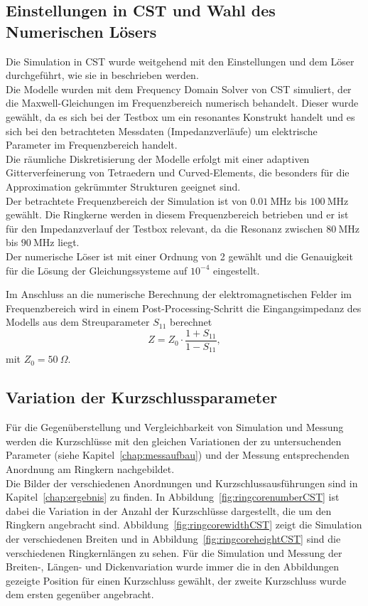         \subsection{Einstellungen in CST und Wahl des Numerischen Lösers}
        Die Simulation in CST wurde weitgehend mit den Einstellungen und dem Löser durchgeführt, wie sie in \citep{bast2017ba} beschrieben werden.\\
        Die Modelle wurden mit dem Frequency Domain Solver von CST simuliert, der die Maxwell-Gleichungen im Frequenzbereich numerisch behandelt. Dieser wurde gewählt, da es sich bei der Testbox um ein resonantes Konstrukt handelt und es sich bei den betrachteten Messdaten (Impedanzverläufe) um elektrische Parameter im Frequenzbereich handelt.\\
        Die räumliche Diskretisierung der Modelle erfolgt mit einer adaptiven Gitterverfeinerung von Tetraedern und Curved-Elements, die besonders für die Approximation gekrümmter Strukturen geeignet sind.\\
        Der betrachtete Frequenzbereich der Simulation ist von $\SI{0,01}{\mega\hertz}$ bis $\SI{100}{\mega\hertz}$ gewählt. Die Ringkerne werden in diesem Frequenzbereich betrieben und er ist für den Impedanzverlauf der Testbox relevant, da die Resonanz zwischen $\SI{80}{\mega\hertz}$ bis $\SI{90}{\mega\hertz}$ liegt.\\
        Der numerische Löser ist mit einer Ordnung von 2 gewählt und die Genauigkeit für die Lösung der Gleichungssysteme auf $10^{-4}$ eingestellt.
        \par 
        Im Anschluss an die numerische Berechnung der elektromagnetischen Felder im Frequenzbereich wird in einem Post-Processing-Schritt die Eingangsimpedanz des Modells aus dem Streuparameter $S_{11}$ berechnet
            \begin{equation}
                Z = Z_0 \cdot\frac{1+S_{11}}{1-S_{11}},
            \end{equation}
        mit $Z_0 = \SI{50}{\Omega}$.
        
        \subsection{Variation der Kurzschlussparameter}
        Für die Gegenüberstellung und Vergleichbarkeit von Simulation und Messung werden die Kurzschlüsse mit den gleichen Variationen der zu untersuchenden Parameter (siehe Kapitel~\ref{chap:messaufbau}) und der Messung entsprechenden Anordnung am Ringkern  nachgebildet.\\
        Die Bilder der verschiedenen Anordnungen und Kurzschlussausführungen sind in Kapitel~\ref{chap:ergebnis} zu finden. In Abbildung~\ref{fig:ringcorenumberCST} ist dabei die Variation in der Anzahl der Kurzschlüsse dargestellt, die um den Ringkern angebracht sind. Abbildung~\ref{fig:ringcorewidthCST} zeigt die Simulation der verschiedenen Breiten und in Abbildung~\ref{fig:ringcoreheightCST} sind die verschiedenen Ringkernlängen zu sehen. Für die Simulation und Messung der Breiten-, Längen- und Dickenvariation wurde immer die in den Abbildungen gezeigte Position für einen Kurzschluss gewählt, der zweite Kurzschluss wurde dem ersten gegenüber angebracht.


